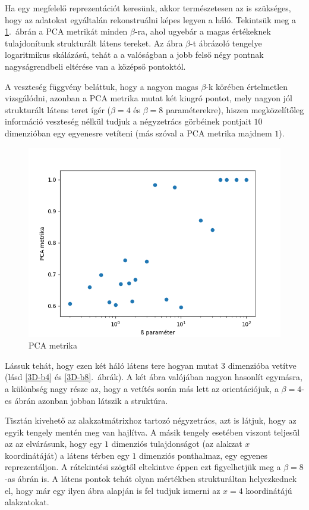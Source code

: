 Ha egy megfelelő reprezentációt keresünk, akkor természetesen az is szükséges, hogy az adatokat egyáltalán rekonstruálni képes legyen a háló. Tekintsük meg a \ref{beta-pca}.~ábrán a PCA metrikát minden $\beta$-ra, ahol ugyebár a magas értékeknek tulajdonítunk strukturált látens tereket. Az ábra $\beta$-t ábrázoló tengelye logaritmikus skálázású, tehát a a valóságban a jobb felső négy pontnak nagyságrendbeli eltérése van a középső pontoktól.

A veszteség függvény beláttuk, hogy a nagyon magas $\beta$-k körében értelmetlen vizsgálódni, azonban a PCA metrika mutat két kiugró pontot, mely nagyon jól strukturált látens teret ígér ($\beta=4$ és $\beta=8$ paraméterekre), hiszen megközelítőleg információ veszteség nélkül tudjuk a négyzetrács görbéinek pontjait $10$ dimenzióban egy egyenesre vetíteni (más szóval a PCA metrika majdnem $1$).

\begin{figure}[h!]
\begin{center}
 
  \includegraphics[width=0.75\linewidth]{metrics/vae_beta-pca-log.png}
  \caption{PCA metrika} \label{beta-pca}
\end{center}
\end{figure}

Lássuk tehát, hogy ezen két háló látens tere hogyan mutat $3$ dimenzióba vetítve (lásd \ref{3D-b4} és \ref{3D-b8}.~ábrák). A két ábra valójában nagyon hasonlít egymásra, a különbség nagy része az, hogy a vetítés során más lett az orientációjuk, a $\beta=4$-es ábrán azonban jobban látszik a struktúra.

Tisztán kivehető az alakzatmátrixhoz tartozó négyzetrács, azt is látjuk, hogy az egyik tengely mentén meg van hajlítva. A másik tengely esetében viszont teljesül az az elvárásunk, hogy egy $1$ dimenziós tulajdonságot (az alakzat $x$ koordinátáját) a látens térben egy $1$ dimenziós ponthalmaz, egy egyenes reprezentáljon. A rátekintési szögtől eltekintve éppen ezt figyelhetjük meg a $\beta=8$-as ábrán is. A látens pontok tehát olyan mértékben strukturáltan helyezkednek el, hogy már egy ilyen ábra alapján is fel tudjuk ismerni az $x=4$ koordinátájú alakzatokat.

